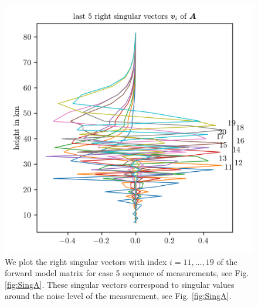 \begin{figure}[ht!]
	\centering
	\includegraphics{MiddleVecA.png}
	\caption[Right singular vectors 11 to 19 of forward model.]{We plot the right singular vectors with index $i = 11,\dots, 19$ of the forward model matrix for case 5 sequence of measurements, see Fig. \ref{fig:SingA}.
		These singular vectors correspond to singular values around the noise level of the measurement, see Fig. \ref{fig:SingA}.}
	\label{fig:middleSpace}
\end{figure}
